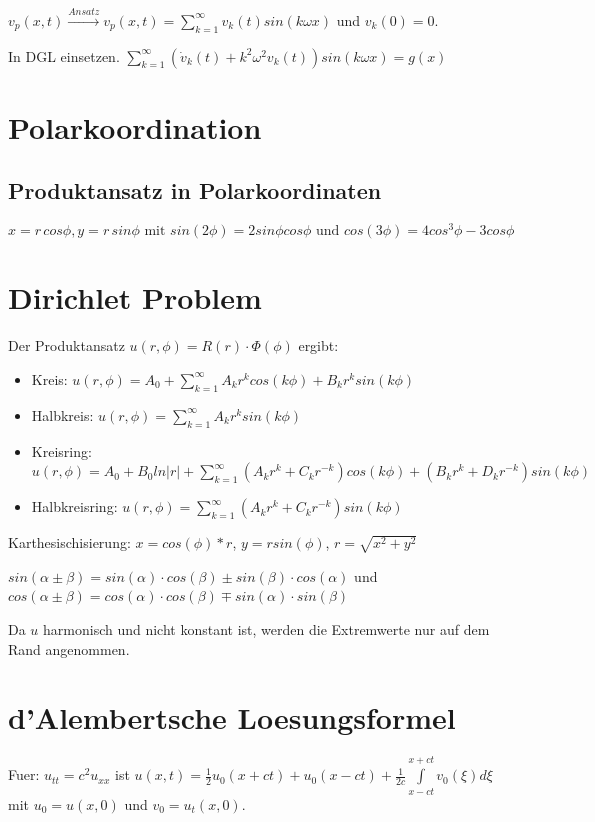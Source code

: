 \documentclass[10pt,a4paper]{article}
\begin{document}
$v_p(x,t) \xrightarrow{Ansatz} v_p(x,t) = \sum\limits_{k=1}^{\infty} v_k(t) sin \left( k \omega x \right)$ und $v_k(0) = 0$.

In DGL einsetzen. $\sum\limits_{k=1}^{\infty} \left(\dot{v}_k(t) + k^2 \omega^2 v_k(t) \right) sin(k \omega x) = g(x)$

\section{Polarkoordination}
\subsection{Produktansatz in Polarkoordinaten}
\[
x = r\,cos\phi, y=r\,sin\phi \mbox{ mit } sin(2\phi)=2sin\phi cos\phi \mbox{ und } cos(3\phi)=4cos^3\phi - 3cos \phi
\]

\section{Dirichlet Problem}
Der Produktansatz $u(r, \phi) = R(r) \cdot \Phi(\phi)$ ergibt:
\begin{itemize}
\item
Kreis: $u(r, \phi) = A_0 + \sum\limits_{k=1}^\infty A_k r^k cos(k \phi) + B_k r^k sin(k \phi)$
\item
Halbkreis: $u(r, \phi) = \sum\limits_{k=1}^\infty A_k r^k sin(k \phi)$
\item
Kreisring: $u(r, \phi) = A_0 + B_0 ln|r| + \sum\limits_{k=1}^\infty \left(A_k r^k + C_k r^{-k} \right) cos(k \phi) + \left(B_k r^k + D_k r^{-k} \right) sin(k \phi)$
\item
Halbkreisring: $u(r, \phi) = \sum\limits_{k=1}^\infty \left(A_k r^k + C_k r^{-k} \right) sin(k \phi)$
\end{itemize}

Karthesischisierung: $x = cos(\phi)*r$, $y = r sin(\phi)$, $r = \sqrt{x^2 + y^2}$

$sin(\alpha \pm \beta) = sin(\alpha)\cdot cos(\beta) \pm sin(\beta)\cdot cos(\alpha)$ und $cos(\alpha \pm \beta) = cos(\alpha)\cdot cos(\beta) \mp sin(\alpha)\cdot sin(\beta)$

Da $u$ harmonisch und nicht konstant ist, werden die Extremwerte nur auf dem Rand angenommen.
\section{d'Alembertsche Loesungsformel}
Fuer: $u_{tt} = c^2 u_{xx}$ ist $u(x,t) = \frac{1}{2}u_0(x+ct) + u_0(x-ct) + \frac{1}{2c}\int\limits_{x-ct}^{x+ct} v_0\left(\xi\right) d \xi $ mit $u_0 = u(x,0)$ und $v_0 = u_t(x,0)$.
\end{document}
